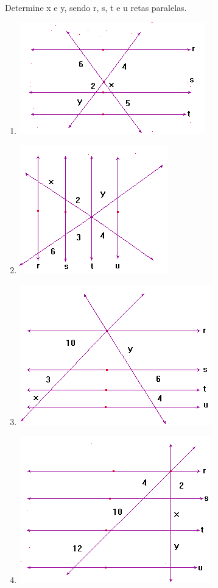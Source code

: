 	\item Determine x e y, sendo r, s, t e u retas paralelas.
		\begin{multicols}{2}
		\begin{enumerate}
			\item \includegraphics[scale=0.7]{figuras/fig53.png}
			\item \includegraphics[scale=0.7]{figuras/fig54.png}
			\item \includegraphics[scale=0.7]{figuras/fig55.png}
			\item \includegraphics[scale=0.7]{figuras/fig56.png} 
		\end{enumerate}
		\end{multicols}
		
